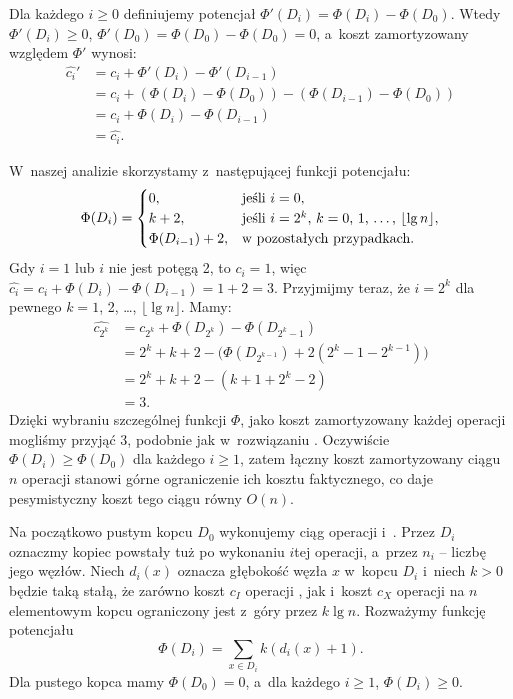 
\exercise %
Dla każdego $i\ge0$ definiujemy potencjał $\Phi'(D_i)=\Phi(D_i)-\Phi(D_0)$.
Wtedy $\Phi'(D_i)\ge0$, $\Phi'(D_0)=\Phi(D_0)-\Phi(D_0)=0$, a~koszt zamortyzowany względem $\Phi'$ wynosi:
\begin{align*}
	\widehat{c_i}' &= c_i+\Phi'(D_i)-\Phi'(D_{i-1}) \\
	&= c_i+(\Phi(D_i)-\Phi(D_0))-(\Phi(D_{i-1})-\Phi(D_0)) \\
	&= c_i+\Phi(D_i)-\Phi(D_{i-1}) \\
	&= \widehat{c_i}.
\end{align*}

\exercise %
W~naszej analizie skorzystamy z~następującej funkcji potencjału:
\[
	\Phi(D_i) = \begin{cases}
		0, & \text{jeśli $i=0$}, \\
		k+2, & \text{jeśli $i=2^k$, $k=0$, 1, \dots, $\lfloor\lg n\rfloor$}, \\
		\Phi(D_{i-1})+2, & \text{w~pozostałych przypadkach}.
	\end{cases}
\]
Gdy $i=1$ lub $i$ nie jest potęgą 2, to $c_i=1$, więc $\widehat{c_i}=c_i+\Phi(D_i)-\Phi(D_{i-1})=1+2=3$.
Przyjmijmy teraz, że $i=2^k$ dla pewnego $k=1$, 2, \dots, $\lfloor\lg n\rfloor$.
Mamy:
\begin{align*}
	\widehat{c_{2^k}} &= c_{2^k}+\Phi(D_{2^k})-\Phi(D_{2^k-1}) \\
	&= 2^k+k+2-\bigl(\Phi(D_{2^{k-1}})+2(2^k-1-2^{k-1})\bigr) \\
	&= 2^k+k+2-(k+1+2^k-2) \\
	&= 3.
\end{align*}
Dzięki wybraniu szczególnej funkcji $\Phi$, jako koszt zamortyzowany każdej operacji mogliśmy przyjąć 3, podobnie jak w~rozwiązaniu .
Oczywiście $\Phi(D_i)\ge\Phi(D_0)$ dla każdego $i\ge1$, zatem łączny koszt zamortyzowany ciągu $n$ operacji stanowi górne ograniczenie ich kosztu faktycznego, co daje pesymistyczny koszt tego ciągu równy $O(n)$.

\exercise %
Na początkowo pustym kopcu $D_0$ wykonujemy ciąg operacji  i~.
Przez $D_i$ oznaczmy kopiec powstały tuż po wykonaniu $i$\nbhyphen tej operacji, a~przez $n_i$ -- liczbę jego węzłów.
Niech $d_i(x)$ oznacza głębokość węzła $x$ w~kopcu $D_i$ i~niech $k>0$ będzie taką stałą, że zarówno koszt $c_I$ operacji , jak i~koszt $c_X$ operacji  na $n$\nbhyphen elementowym kopcu ograniczony jest z~góry przez $k\lg n$.
Rozważymy funkcję potencjału
\[
	\Phi(D_i) = \sum_{x\in D_i}k(d_i(x)+1).
\]
Dla pustego kopca mamy $\Phi(D_0)=0$, a~dla każdego $i\ge1$, $\Phi(D_i)\ge0$.

